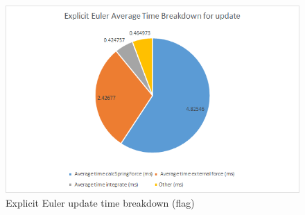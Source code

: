     \begin{figure}
    \begin{center}
      \includegraphics[scale=.9]{Figures/flag_ee_ut}
    \end{center}
    \caption{Explicit Euler update time breakdown (flag)}
    \label{fig:ee ut flag}
  \end{figure}

